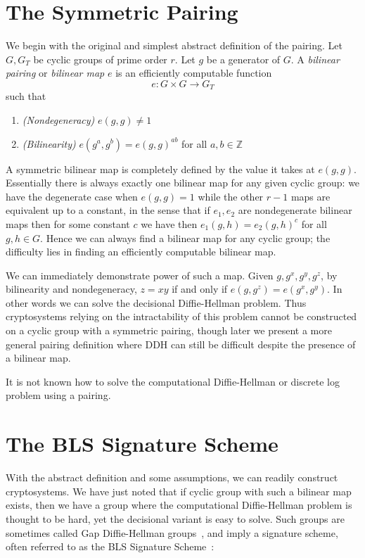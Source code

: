 \section{\label{sec:symmetricpairing}The Symmetric Pairing}

We begin with the original and simplest abstract definition of the pairing.
Let $G, G_T$ be cyclic groups of prime order $r$.
Let $g$ be a generator of $G$.
A \emph{bilinear pairing} or \emph{bilinear map}
$e$ is an efficiently computable function
\[
e:G \times G \rightarrow G_T
\]
such that
\begin{enumerate}
\item
\emph{(Nondegeneracy)}
$e(g,g) \ne 1$
\item
\emph{(Bilinearity)}
$e(g^a, g^b) = e(g,g)^{a b}$ for all $a, b \in \mathbb{Z}$
\end{enumerate}

A symmetric bilinear map is completely defined by the value it takes at
$e(g,g)$. Essentially there is always exactly one bilinear map for any given
cyclic group:
we have the degenerate case when $e(g,g)=1$
while the other $r-1$ maps are
equivalent up to a constant,
in the sense that if $e_1, e_2$ are nondegenerate bilinear maps then for
some constant $c$ we have
then $e_1(g,h) = e_2(g,h)^c$ for all $g,h \in G$.
Hence we can always find a bilinear map for any cyclic group;
the difficulty lies in finding an efficiently computable bilinear map.

We can immediately demonstrate power of such a map. Given
$g, g^x, g^y, g^z$, by bilinearity and nondegeneracy,
$z = x y$ if and only if
$e(g, g^z) = e(g^x, g^y)$. In other words we can solve the decisional
Diffie-Hellman problem. Thus cryptosystems relying on the intractability of
this problem cannot be constructed on a cyclic group with a symmetric pairing,
though later we present a more general pairing definition where DDH can still
be difficult despite the presence of a bilinear map.

It is not known how to solve the computational Diffie-Hellman
or discrete log problem using a pairing.

\section{The BLS Signature Scheme}

With the abstract definition and some assumptions, we can readily construct
cryptosystems. We have just noted that if cyclic group with such a bilinear map
exists, then we have a group where the computational Diffie-Hellman problem is
thought to be hard, yet the decisional variant is easy to solve. Such groups
are sometimes called Gap Diffie-Hellman groups~\cite{op}, and imply a signature
scheme, often referred to as the BLS Signature Scheme~\cite{bls}:

